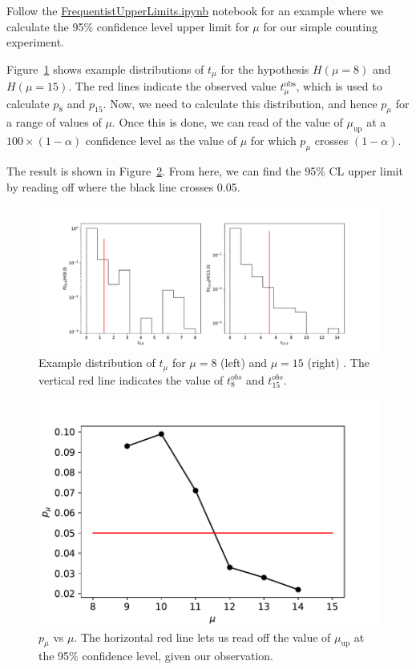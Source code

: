 Follow the \href{https://github.com/nucleosynthesis/PGStatistics/blob/main/notebooks/FrequentistUpperLimits.ipynb}{FrequentistUpperLimits.ipynb} notebook for an example where we calculate the 95\% confidence level upper limit for $\mu$ for our simple counting experiment. 

Figure~\ref{fig:tmu_example} shows example distributions of $t_{\mu}$ for the hypothesis $H(\mu=8)$ and $H(\mu=15)$. The red lines indicate the observed value $t_{\mu}^{\mathrm{obs}}$, which is used to calculate $p_{8}$ and $p_{15}$. Now, we need to calculate this distribution, and hence $p_{\mu}$ for a range of values of $\mu$. Once this is done, we can read of the value of $\mu_\mathrm{up}$ at a $100\times(1-\alpha)$ confidence level as the value of $\mu$ for which $p_{\mu}$ crosses $(1-\alpha)$. 

The result is shown in Figure~\ref{fig:pmu_example}. From here, we can find the 95\% CL upper limit by reading off where the black line crosses 0.05. 

\begin{figure}
    \centering
    \includegraphics[width=\textwidth]{figures/Hypotest/p10.pdf}
    \caption{Example distribution of $t_{\mu}$ for $\mu=8$ (left) and $\mu=15$ (right) . The vertical red line indicates the value of  $t_{8}^{obs}$ and $t_{15}^{obs}$.}
    \label{fig:tmu_example}
\end{figure}

\begin{figure}
    \centering
    \includegraphics[width=\textwidth]{figures/Hypotest/scan_pmu.pdf}
    \caption{
    $p_{\mu}$ vs $\mu$. The horizontal red line lets us read off the value of $\mu_{\mathrm{up}}$ at the 95\% confidence level, given our observation.}
    \label{fig:pmu_example}
\end{figure}

